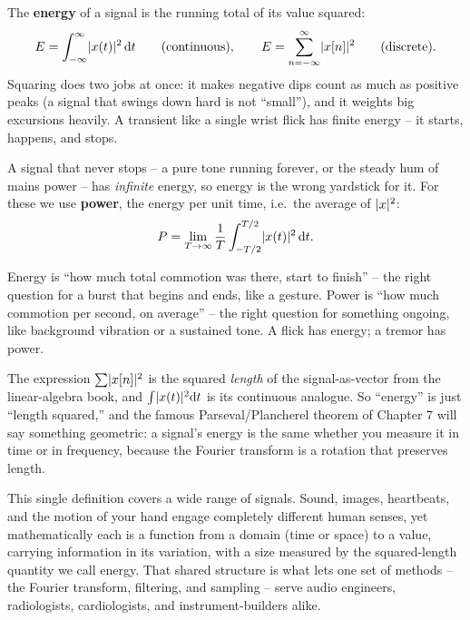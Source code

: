 The \textbf{energy} of a signal is the running total of its value squared:
\[
  E = \int_{-\infty}^{\infty} \lvert x(t)\rvert^2 \,\mathrm{d} t
  \qquad\text{(continuous)}, \qquad
  E = \sum_{n=-\infty}^{\infty} \lvert x[n]\rvert^2
  \qquad\text{(discrete)}.
\]
Squaring does two jobs at once: it makes negative dips count as much as positive peaks (a signal
that swings down hard is not ``small''), and it weights big excursions heavily. A transient like a
single wrist flick has finite energy -- it starts, happens, and stops.

A signal that never stops -- a pure tone running forever, or the steady hum of mains power -- has
\emph{infinite} energy, so energy is the wrong yardstick for it. For these we use \textbf{power},
the energy per unit time, i.e.\ the average of $\lvert x\rvert^2$:
\[
  P = \lim_{T\to\infty} \frac{1}{T}\int_{-T/2}^{T/2} \lvert x(t)\rvert^2 \,\mathrm{d} t .
\]

\begin{intuitionbox}
Energy is ``how much total commotion was there, start to finish'' -- the right question for a burst
that begins and ends, like a gesture. Power is ``how much commotion per second, on average'' -- the
right question for something ongoing, like background vibration or a sustained tone. A flick has
energy; a tremor has power.
\end{intuitionbox}

\begin{connectionbox}
The expression $\sum \lvert x[n]\rvert^2$ is the squared \emph{length} of the signal-as-vector from the
linear-algebra book, and $\int \lvert x(t)\rvert^2 \mathrm{d} t$ is its continuous analogue. So ``energy'' is
just ``length squared,'' and the famous Parseval/Plancherel theorem of Chapter 7 will say
something geometric: a signal's energy is the same whether you measure it in time or
in frequency, because the Fourier transform is a rotation that preserves length.
\end{connectionbox}

\begin{aestheticbox}
This single definition covers a wide range of signals. Sound, images, heartbeats, and the motion of your
hand engage completely different human senses, yet mathematically each is a function from a domain
(time or space) to a value, carrying information in its variation, with a size measured by the
squared-length quantity we call energy. That shared structure is what lets one set of methods --
the Fourier transform, filtering, and sampling -- serve audio engineers, radiologists,
cardiologists, and instrument-builders alike.
\end{aestheticbox}


